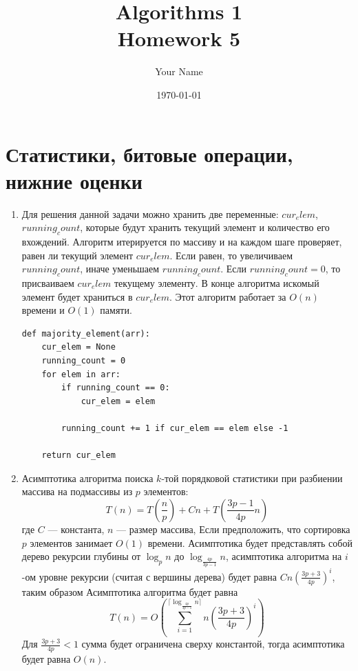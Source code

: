 \documentclass{article}
\title{Algorithms 1 \\ Homework 5}
\author{Your Name}
\date{\today}
\begin{document}
\maketitle

\section{Статистики, битовые операции, нижние оценки}
\begin{enumerate}
    \item Для решения данной задачи можно хранить
          две переменные: $cur_elem$, $running_count$,
          которые будут хранить текущий элемент и количество
          его вхождений. Алгоритм итерируется по массиву и
          на каждом шаге проверяет, равен ли текущий элемент
          $cur_elem$. Если равен, то увеличиваем $running_count$,
          иначе уменьшаем $running_count$. Если $running_count = 0$,
          то присваиваем $cur_elem$ текущему элементу. В конце
          алгоритма искомый элемент будет храниться в $cur_elem$.
          Этот алгоритм работает за $O(n)$ времени и $O(1)$ памяти.
          \begin{lstlisting}
def majority_element(arr):
    cur_elem = None
    running_count = 0
    for elem in arr:
        if running_count == 0:
            cur_elem = elem

        running_count += 1 if cur_elem == elem else -1

    return cur_elem
    \end{lstlisting}

    \item Асимптотика алгоритма поиска $k$-той
          порядковой статистики при разбиении массива
          на подмассивы из $p$ элементов:
          \[
              T(n) = T(\frac{n}{p}) + Cn + T(\frac{3p - 1}{4p} n)
          \]
          где $C$ --- константа, $n$ --- размер массива,
          Если предположить, что сортировка $p$ элементов
          занимает $O(1)$ времени.
          Асимптотика будет представлять собой дерево
          рекурсии глубины от $\log_p n$ до
          $\log_{\frac{4p}{3p - 1}} n$, асимптотика
          алгоритма на $i$-ом уровне рекурсии
          (считая с вершины дерева) будет равна
          $Cn(\frac{3p + 3}{4p})^i$, таким образом
          Асимптотика алгоритма будет равна
          \[
              T(n) = O(\sum_{i=1}^{\lceil \log_{\frac{4p}{3p - 1}}{n} \rceil} n(\frac{3p + 3}{4p})^i)
          \]
          Для $\frac{3p + 3}{4p} < 1$ сумма будет
          ограничена сверху константой, тогда асимптотика
          будет равна $O(n)$.


\end{enumerate}
\end{document}
